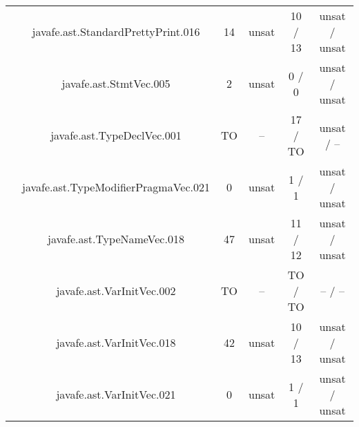 \begin{table}[htbp]
\begin{minipage}{0.60\textwidth}
{\begin{tabular}[c]{c c!{\vrule width 1.5pt}c|c!{\vrule width 1.5pt}c|c|}
 			& javafe.ast.StandardPrettyPrint.016    		     & 14   & unsat   & 10  / 13       & unsat / unsat     \\
 			& javafe.ast.StmtVec.005		  		     & 2    & unsat   & 0   / 0        & unsat / unsat     \\
		 	& javafe.ast.TypeDeclVec.001	    			     & TO   & --      & 17  / TO       & unsat / --        \\
		 	& javafe.ast.TypeModifierPragmaVec.021 			     & 0    & unsat   & 1   / 1        & unsat / unsat     \\
 			& javafe.ast.TypeNameVec.018				     & 47   & unsat   & 11  / 12       & unsat / unsat     \\
 			& javafe.ast.VarInitVec.002		   		     & TO   & --      & TO  / TO       & --    / --        \\
 			& javafe.ast.VarInitVec.018		   		     & 42   & unsat   & 10  / 13       & unsat / unsat     \\
		 	& javafe.ast.VarInitVec.021	    			     & 0    & unsat   & 1   / 1        & unsat / unsat     \\

\end{tabular}}
\end{minipage}
\end{table}
